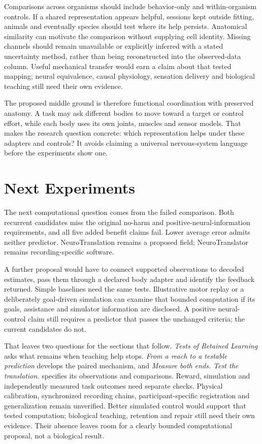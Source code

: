 Comparisons across organisms should include behavior-only and within-organism controls. If a shared representation appears helpful, sessions kept outside fitting, animals and eventually species should test where its help persists. Anatomical similarity can motivate the comparison without supplying cell identity. Missing channels should remain unavailable or explicitly inferred with a stated uncertainty method, rather than being reconstructed into the observed-data column. Useful mechanical transfer would earn a claim about that tested mapping; neural equivalence, causal physiology, sensation delivery and biological teaching still need their own evidence.

The proposed middle ground is therefore functional coordination with preserved anatomy. A task may ask different bodies to move toward a target or control effort, while each body uses its own joints, muscles and sensor models. That makes the research question concrete: which representation helps under these adapters and controls? It avoids claiming a universal nervous-system language before the experiments show one.

\section{Next Experiments}

The next computational question comes from the failed comparison. Both
recurrent candidates miss the original no-harm and positive-neural-information
requirements, and all five added benefit claims fail. Lower average error
admits neither predictor. NeuroTranslation remains a proposed field;
NeuroTranslator remains recording-specific software.

A further proposal would have to connect supported observations to decoded
estimates, pass them through a declared body adapter and identify the feedback
returned. Simple baselines need the same tests. Illustrative motor replay or a
deliberately goal-driven simulation can examine that bounded computation if its
goals, assistance and simulator information are disclosed. A positive
neural-control claim still requires a predictor that passes the unchanged
criteria; the current candidates do not.

That leaves two questions for the sections that follow. \emph{Tests of Retained
Learning} asks what remains when teaching help stops. \emph{From a reach to a
testable prediction} develops the paired mechanism, and \emph{Measure both ends.
Test the translation.} specifies its observations and comparisons. Reward,
simulation and independently measured task outcomes need separate checks.
Physical calibration, synchronized recording chains, participant-specific
registration and generalization remain unverified. Better simulated control
would support that tested computation; biological teaching, retention and
repair still need their own evidence. Their absence leaves room for a clearly
bounded computational proposal, not a biological result.

